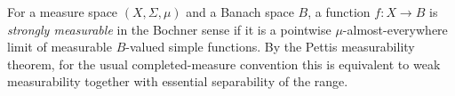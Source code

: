 
For a measure space $(X,\Sigma,\mu)$ and a Banach space $B$, a function $f:X\to B$ is \emph{strongly measurable} in the Bochner sense if it is a pointwise $\mu$-almost-everywhere limit of measurable $B$-valued simple functions. By the Pettis measurability theorem, for the usual completed-measure convention this is equivalent to weak measurability together with essential separability of the range.
